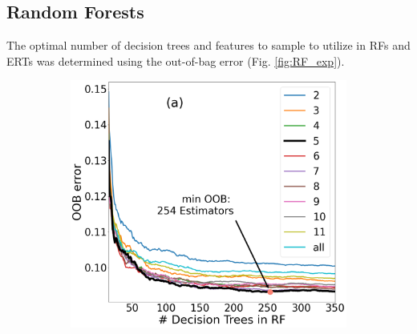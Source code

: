 \documentclass[a4paper, twoside, final, 12pt]{article}
\begin{document}
{\subsection{Random Forests}

The optimal number of decision trees and features to sample to utilize in RFs and ERTs was determined using the out-of-bag error (Fig. \ref{fig:RF_exp}). 
\begin{figure}[h!]
	\begin{subfigure}{0.48\linewidth}
		\centering
		\includegraphics[scale=0.19]{./src/RF_oob_error}


\end{subfigure}
\end{figure}}
\end{document}
